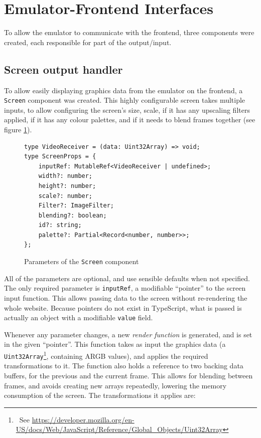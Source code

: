 \documentclass[11pt]{informatics-report}
\newcommand{\ftnt}[1]{\footnote{~See \url{#1}}}
\begin{document}
\section{Emulator-Frontend Interfaces}

To allow the emulator to communicate with the frontend, three components were created, each responsible for part of the output/input.

\subsection{Screen output handler}

To allow easily displaying graphics data from the emulator on the frontend, a \texttt{Screen} component was created. This highly configurable screen takes multiple inputs, to allow configuring the screen's size, scale, if it has any upscaling filters applied, if it has any colour palettes, and if it needs to blend frames together (see figure \ref{fig:screen-params}).

\begin{figure}[h]
    \begin{verbatim}
type VideoReceiver = (data: Uint32Array) => void;
type ScreenProps = {
    inputRef: MutableRef<VideoReceiver | undefined>;
    width?: number;
    height?: number;
    scale?: number;
    Filter?: ImageFilter;
    blending?: boolean;
    id?: string;
    palette?: Partial<Record<number, number>>;
};
    \end{verbatim}
    \caption{Parameters of the \texttt{Screen} component}
    \label{fig:screen-params}
\end{figure}

All of the parameters are optional, and use sensible defaults when not specified. The only required parameter is \texttt{inputRef}, a modifiable ``pointer'' to the screen input function. This allows passing data to the screen without re-rendering the whole website. Because pointers do not exist in TypeScript, what is passed is actually an object with a modifiable \texttt{value} field.

Whenever any parameter changes, a new \textit{render function} is generated, and is set in the given ``pointer''. This function takes as input the graphics data (a \texttt{Uint32Array}\ftnt{https://developer.mozilla.org/en-US/docs/Web/JavaScript/Reference/Global_Objects/Uint32Array}, containing ARGB values), and applies the required transformations to it. The function also holds a reference to two backing data buffers, for the previous and the current frame. This allows for blending between frames, and avoids creating new arrays repeatedly, lowering the memory consumption of the screen. The transformations it applies are:
\end{document}
